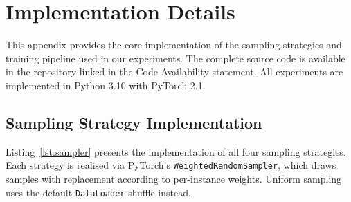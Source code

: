 \documentclass[12pt,a4paper]{article}
\begin{document}
\section{Implementation Details}
\label{app:code}

This appendix provides the core implementation of the sampling strategies and training pipeline used in our experiments. The complete source code is available in the repository linked in the Code Availability statement. All experiments are implemented in Python 3.10 with PyTorch 2.1.

\subsection{Sampling Strategy Implementation}
\label{app:sampler_code}

Listing~\ref{lst:sampler} presents the implementation of all four sampling strategies. Each strategy is realised via PyTorch's \texttt{WeightedRandomSampler}, which draws samples with replacement according to per-instance weights. Uniform sampling uses the default \texttt{DataLoader} shuffle instead.
\end{document}

